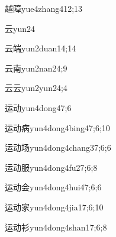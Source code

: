 \begin{verbete}{越障}{yue4zhang4}{12;13}
\end{verbete}

\begin{verbete}{云}{yun2}{4}
\end{verbete}

\begin{verbete}{云端}{yun2duan1}{4;14}
\end{verbete}

\begin{verbete}{云南}{yun2nan2}{4;9}
\end{verbete}

\begin{verbete}{云云}{yun2yun2}{4;4}
\end{verbete}

\begin{verbete}{运动}{yun4dong4}{7;6}
\end{verbete}

\begin{verbete}{运动病}{yun4dong4bing4}{7;6;10}
\end{verbete}

\begin{verbete}{运动场}{yun4dong4chang3}{7;6;6}
\end{verbete}

\begin{verbete}{运动服}{yun4dong4fu2}{7;6;8}
\end{verbete}

\begin{verbete}{运动会}{yun4dong4hui4}{7;6;6}
\end{verbete}

\begin{verbete}{运动家}{yun4dong4jia1}{7;6;10}
\end{verbete}

\begin{verbete}{运动衫}{yun4dong4shan1}{7;6;8}
\end{verbete}

